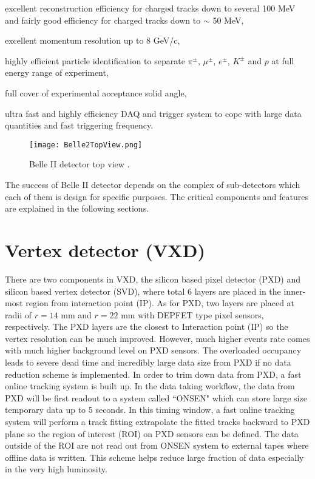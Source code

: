 \textbullet \space excellent reconstruction efficiency for charged tracks down to several 100 MeV and fairly good efficiency for charged tracks down to $\sim$ 50 MeV,

\textbullet \space excellent momentum resolution up to 8 GeV/c,

\textbullet \space highly efficient particle identification to separate $\pi^{\pm}$, $\mu^{\pm}$, $e^{\pm}$, $K^{\pm}$ and $p$ at full energy range of experiment,

\textbullet \space full cover of experimental acceptance solid angle,

\textbullet \space ultra fast and highly efficiency DAQ and trigger system to cope with large data quantities and fast triggering frequency. 

\begin{figure}[htbp]
	\centering 
	\texttt{[image: Belle2TopView.png]}
	\caption{Belle II detector top view \cite{b2book}.}
	\label{fig:belle2_view}
\end{figure}

The success of Belle II detector depends on the complex of sub-detectors which each of them is design for specific purposes. The critical components and features are explained in the following sections. 

\section{Vertex detector (VXD)}
There are two components in VXD, the silicon based pixel detector (PXD) and silicon based vertex detector (SVD), where total 6 layers are placed in the inner-most region from interaction point (IP). As for PXD, two layers are placed at radii of $r=14$ mm and $r=22$ mm with DEPFET type pixel sensors, respectively. 
The PXD layers are the closest to Interaction point (IP) so the vertex resolution can be much improved. However, much higher events rate comes with much higher background level on PXD sensors. The overloaded occupancy leads to severe dead time and incredibly large data size from PXD if no data reduction scheme is implemented. In order to trim down data from PXD, a fast online tracking system is built up. In the data taking workflow, the data from PXD will be first readout to a system called ``ONSEN" which can store large size temporary data up to 5 seconds. In this timing window, a fast online tracking system will perform a track fitting extrapolate the fitted tracks backward to PXD plane so the region of interest (ROI) on PXD sensors can be defined. The data outside of the ROI are not read out from ONSEN system to external tapes where offline data is written. This scheme helps reduce large fraction of data especially in the very high luminosity.

